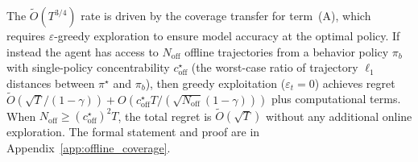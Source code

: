 \begin{rmk}
The $\widetilde O(T^{3/4})$ rate is driven by the coverage transfer for term~(A), which requires $\varepsilon$-greedy exploration to ensure model accuracy at the optimal policy. If instead the agent has access to $N_{\mathrm{off}}$ offline trajectories from a behavior policy $\pi_b$ with single-policy concentrability $c_{\mathrm{off}}^\star$ (the worst-case ratio of trajectory $\ell_1$ distances between $\pi^\star$ and $\pi_b$), then greedy exploitation ($\varepsilon_t=0$) achieves regret $\widetilde O(\sqrt{T}/(1-\gamma)) + O(c_{\mathrm{off}}^\star T/(\sqrt{N_{\mathrm{off}}}(1-\gamma)))$ plus computational terms. When $N_{\mathrm{off}} \ge (c_{\mathrm{off}}^\star)^2 T$, the total regret is $\widetilde O(\sqrt{T})$ without any additional online exploration. The formal statement and proof are in Appendix~\ref{app:offline_coverage}.
\end{rmk}




 



